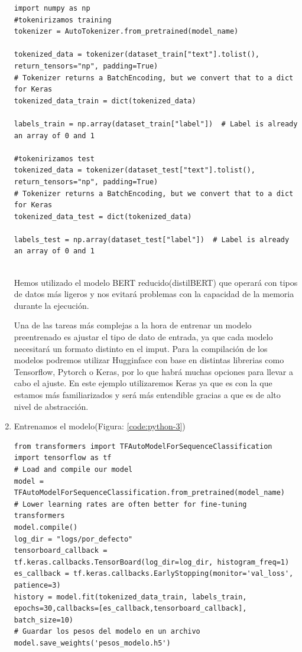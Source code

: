 \begin{enumerate}
\begin{lstlisting}[style=mystyle, label=code:python-2,caption=Tokinerización de datos]
import numpy as np
#tokenirizamos training
tokenizer = AutoTokenizer.from_pretrained(model_name)

tokenized_data = tokenizer(dataset_train["text"].tolist(), return_tensors="np", padding=True)
# Tokenizer returns a BatchEncoding, but we convert that to a dict for Keras
tokenized_data_train = dict(tokenized_data)

labels_train = np.array(dataset_train["label"])  # Label is already an array of 0 and 1

#tokenirizamos test
tokenized_data = tokenizer(dataset_test["text"].tolist(), return_tensors="np", padding=True)
# Tokenizer returns a BatchEncoding, but we convert that to a dict for Keras
tokenized_data_test = dict(tokenized_data)

labels_test = np.array(dataset_test["label"])  # Label is already an array of 0 and 1


            \end{lstlisting}
Hemos utilizado el modelo BERT reducido(distilBERT) que operará con tipos de datos más ligeros y nos evitará problemas con la capacidad de la memoria durante la ejecución.

Una de las tareas más complejas a la hora de entrenar un modelo preentrenado es ajustar el tipo de dato de entrada, ya que cada modelo necesitará un formato distinto en el imput.
Para la compilación de los modelos podremos utilizar Hugginface con base en distintas librerias como Tensorflow, Pytorch o Keras, por lo que habrá muchas opciones para llevar a cabo el ajuste. En este ejemplo utilizaremos Keras ya que es con la que estamos más familiarizados y será más entendible gracias a que es de alto nivel de abstracción.

\newpage
          \item Entrenamos el modelo(Figura: \ref{code:python-3})
                    \begin{lstlisting}[style=mystyle, label=code:python-3,caption=Ajuste del modelo ]
from transformers import TFAutoModelForSequenceClassification
import tensorflow as tf
# Load and compile our model
model = TFAutoModelForSequenceClassification.from_pretrained(model_name)
# Lower learning rates are often better for fine-tuning transformers
model.compile() 
log_dir = "logs/por_defecto"
tensorboard_callback = tf.keras.callbacks.TensorBoard(log_dir=log_dir, histogram_freq=1)
es_callback = tf.keras.callbacks.EarlyStopping(monitor='val_loss', patience=3)
history = model.fit(tokenized_data_train, labels_train, epochs=30,callbacks=[es_callback,tensorboard_callback], batch_size=10)
# Guardar los pesos del modelo en un archivo
model.save_weights('pesos_modelo.h5')


\end{lstlisting}
\end{enumerate}
